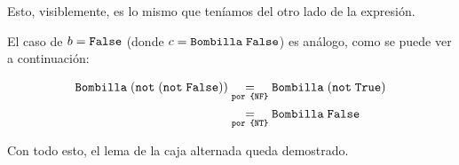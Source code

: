 Esto, visiblemente, es lo mismo que teníamos del otro lado de la expresión.

El caso de $b = \false$ (donde $c = \bombilla{\false}$) es análogo, como se puede ver a continuación:

\begin{equation*}
    \begin{aligned}
        \igualesPor{\bombilla{(\notfunc \; (\notfunc \; \false))}}{\bombilla{(\notfunc \; \true)}}{por \formula{NF}} \\
        \igualesPor{}{\bombilla{\false}}{por \formula{NT}} \\
    \end{aligned}
\end{equation*}

Con todo esto, el lema de la caja alternada queda demostrado.

